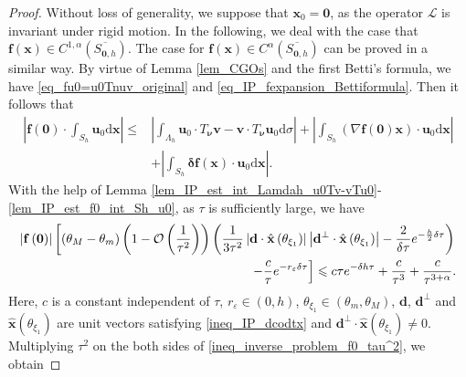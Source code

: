 \documentclass[10pt,a4paper]{amsart}
\begin{document}
\begin{proof} 
	Without loss of generality, we suppose that $ \mathbf{x}_0 = \bm{0} $, as the operator $ \mathcal{L} $ is invariant under rigid motion. In the following, we deal with the case that $\mathbf{f}\left(\mathbf{x}\right) \in C^{1,\alpha} \left(\overline{S_{\mathbf{0},h}}\right)$. The case for $\mathbf{f}\left(\mathbf{x}\right) \in C^{\alpha} \left(\overline{S_{\mathbf{0},h}}\right)$ can be proved in a similar way. By virtue of Lemma \ref{lem_CGOs} and the first Betti's formula, we have \eqref{eq_fu0=u0Tnuv_original} and \eqref{eq_IP_fexpansion_Bettiformula}. Then it follows that
	\begin{align*} 
		\left| \mathbf{f} \left(\bm{0}\right) \cdot \int_{S_h} \mathbf{u}_0 \mathrm{d}\mathbf{x} \right|	\leqslant & \left| \int_{\Lambda_h} \mathbf{u}_0 \cdot T_{\bm{\nu}} \mathbf{v} - \mathbf{v} \cdot T_{\bm{\nu}} \mathbf{u}_0 \mathrm{d}\sigma \right| + \left| \int_{S_h} \left( \nabla \mathbf{f} \left(\bm{0}\right) \mathbf{x} \right) \cdot \mathbf{u}_0 \mathrm{d}\mathbf{x} \right| \\
		& + \left| \int_{S_h} \bm{\delta} \mathbf{f} \left(\mathbf{x}\right) \cdot \mathbf{u}_0 \mathrm{d}\mathbf{x} \right|. 
	\end{align*}
	With the help of Lemma \ref{lem_IP_est_int_Lamdah_u0Tv-vTu0}-\ref{lem_IP_est_f0_int_Sh_u0}, as $ \tau $ is sufficiently large, we have  
	\begin{align} \label{ineq_inverse_problem_f0_tau^2}
		\left| \mathbf{f}\left(\bm{0}\right) \right|\left[\left(\theta_M-\theta_m\right)\left(1-\mathcal{O}\left(\frac{1}{\tau^2}\right)\right) \left(\frac{1}{3 \tau^2}\left|\mathbf{d}\cdot\hat{\mathbf{x}} \left(\theta_{\xi_1}\right)\right| \left|\mathbf{d}^{\perp}\cdot\hat{\mathbf{x}} \left(\theta_{\xi_1}\right)\right| - \frac{2}{\delta\tau} e^{-\frac{h}{2} \delta \tau}\right) \right. \notag \\
		\left.- \frac{c}{\tau}e^{-r_{\varepsilon} \delta \tau}\right] \leqslant  c \tau e^{- \delta h \tau} +  \frac{c}{\tau^3} + \frac{c}{\tau^{3+\alpha}}.
	\end{align}
	Here, $ c $ is a constant independent of $ \tau $, $ r_{\varepsilon}\in\left(0,h\right) $, $ \theta_{\xi_1} \in \left(\theta_m, \theta_M\right) $, $ \mathbf{d} $, $ \mathbf{d}^{\perp} $ and $ \hat{\mathbf{x}}\left(\theta_{\xi_1}\right) $ are unit vectors satisfying \eqref{ineq_IP_dcodtx} and $ \mathbf{d}^{\perp}\cdot\hat{\mathbf{x}} \left(\theta_{\xi_1}\right) \neq 0 $. Multiplying $ \tau^2 $ on the both sides of \eqref{ineq_inverse_problem_f0_tau^2}, we obtain 

\end{proof}
\end{document}
